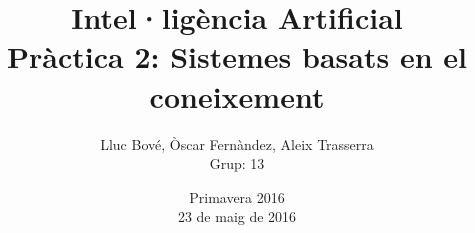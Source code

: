 \documentclass{article}[12pt]
\begin{document}
\title{Intel·ligència Artificial \\ \large
Pràctica 2: Sistemes basats en el coneixement}
\author{Lluc Bové, Òscar Fernàndez, Aleix Trasserra \\
Grup: 13}
\date{ Primavera 2016\\ \large 23 de maig de 2016}
\maketitle
\newpage
{}
\tableofcontents
\newpage







\end{document}
